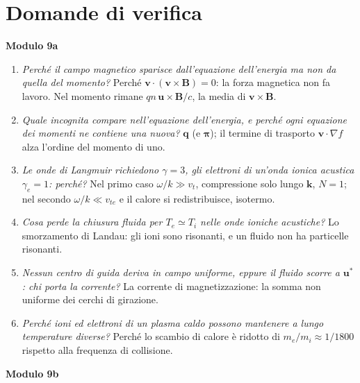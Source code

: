 \section{Domande di verifica}
\textbf{Modulo 9a}
\begin{enumerate}
\item \textit{Perché il campo magnetico sparisce dall'equazione dell'energia ma non da quella del momento?} Perché $\mathbf{v}\cdot(\mathbf{v}\times\mathbf{B})=0$: la forza magnetica non fa lavoro. Nel momento rimane $qn\,\mathbf{u}\times\mathbf{B}/c$, la media di $\mathbf{v}\times\mathbf{B}$.
\item \textit{Quale incognita compare nell'equazione dell'energia, e perché ogni equazione dei momenti ne contiene una nuova?} $\mathbf{q}$ (e $\boldsymbol\pi$); il termine di trasporto $\mathbf{v}\cdot\nabla f$ alza l'ordine del momento di uno.
\item \textit{Le onde di Langmuir richiedono $\gamma=3$, gli elettroni di un'onda ionica acustica $\gamma_e=1$: perché?} Nel primo caso $\omega/k\gg v_t$, compressione solo lungo $\mathbf{k}$, $N=1$; nel secondo $\omega/k\ll v_{te}$ e il calore si redistribuisce, isotermo.
\item \textit{Cosa perde la chiusura fluida per $T_e\simeq T_i$ nelle onde ioniche acustiche?} Lo smorzamento di Landau: gli ioni sono risonanti, e un fluido non ha particelle risonanti.
\item \textit{Nessun centro di guida deriva in campo uniforme, eppure il fluido scorre a $\mathbf{u}^*$: chi porta la corrente?} La corrente di magnetizzazione: la somma non uniforme dei cerchi di girazione.
\item \textit{Perché ioni ed elettroni di un plasma caldo possono mantenere a lungo temperature diverse?} Perché lo scambio di calore è ridotto di $m_e/m_i\approx1/1800$ rispetto alla frequenza di collisione.
\end{enumerate}
\textbf{Modulo 9b}
